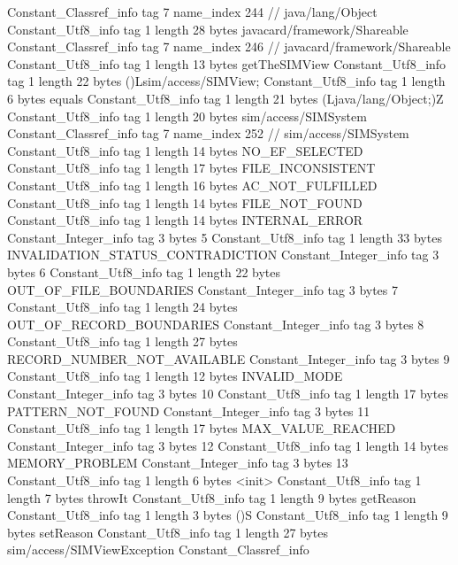 {{{		}
		Constant_Classref_info {
			tag	7
			name_index	244		// java/lang/Object
		}
		Constant_Utf8_info {
			tag	1
			length	28
			bytes	javacard/framework/Shareable
		}
		Constant_Classref_info {
			tag	7
			name_index	246		// javacard/framework/Shareable
		}
		Constant_Utf8_info {
			tag	1
			length	13
			bytes	getTheSIMView
		}
		Constant_Utf8_info {
			tag	1
			length	22
			bytes	()Lsim/access/SIMView;
		}
		Constant_Utf8_info {
			tag	1
			length	6
			bytes	equals
		}
		Constant_Utf8_info {
			tag	1
			length	21
			bytes	(Ljava/lang/Object;)Z
		}
		Constant_Utf8_info {
			tag	1
			length	20
			bytes	sim/access/SIMSystem
		}
		Constant_Classref_info {
			tag	7
			name_index	252		// sim/access/SIMSystem
		}
		Constant_Utf8_info {
			tag	1
			length	14
			bytes	NO_EF_SELECTED
		}
		Constant_Utf8_info {
			tag	1
			length	17
			bytes	FILE_INCONSISTENT
		}
		Constant_Utf8_info {
			tag	1
			length	16
			bytes	AC_NOT_FULFILLED
		}
		Constant_Utf8_info {
			tag	1
			length	14
			bytes	FILE_NOT_FOUND
		}
		Constant_Utf8_info {
			tag	1
			length	14
			bytes	INTERNAL_ERROR
		}
		Constant_Integer_info {
			tag	3
			bytes	5
		}
		Constant_Utf8_info {
			tag	1
			length	33
			bytes	INVALIDATION_STATUS_CONTRADICTION
		}
		Constant_Integer_info {
			tag	3
			bytes	6
		}
		Constant_Utf8_info {
			tag	1
			length	22
			bytes	OUT_OF_FILE_BOUNDARIES
		}
		Constant_Integer_info {
			tag	3
			bytes	7
		}
		Constant_Utf8_info {
			tag	1
			length	24
			bytes	OUT_OF_RECORD_BOUNDARIES
		}
		Constant_Integer_info {
			tag	3
			bytes	8
		}
		Constant_Utf8_info {
			tag	1
			length	27
			bytes	RECORD_NUMBER_NOT_AVAILABLE
		}
		Constant_Integer_info {
			tag	3
			bytes	9
		}
		Constant_Utf8_info {
			tag	1
			length	12
			bytes	INVALID_MODE
		}
		Constant_Integer_info {
			tag	3
			bytes	10
		}
		Constant_Utf8_info {
			tag	1
			length	17
			bytes	PATTERN_NOT_FOUND
		}
		Constant_Integer_info {
			tag	3
			bytes	11
		}
		Constant_Utf8_info {
			tag	1
			length	17
			bytes	MAX_VALUE_REACHED
		}
		Constant_Integer_info {
			tag	3
			bytes	12
		}
		Constant_Utf8_info {
			tag	1
			length	14
			bytes	MEMORY_PROBLEM
		}
		Constant_Integer_info {
			tag	3
			bytes	13
		}
		Constant_Utf8_info {
			tag	1
			length	6
			bytes	<init>
		}
		Constant_Utf8_info {
			tag	1
			length	7
			bytes	throwIt
		}
		Constant_Utf8_info {
			tag	1
			length	9
			bytes	getReason
		}
		Constant_Utf8_info {
			tag	1
			length	3
			bytes	()S
		}
		Constant_Utf8_info {
			tag	1
			length	9
			bytes	setReason
		}
		Constant_Utf8_info {
			tag	1
			length	27
			bytes	sim/access/SIMViewException
		}
		Constant_Classref_info {
}}}

